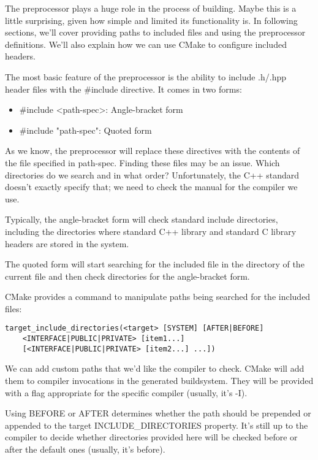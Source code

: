 
The preprocessor plays a huge role in the process of building. Maybe this is a little surprising, given how simple and limited its functionality is. In following sections, we'll cover providing paths to included files and using the preprocessor definitions. We'll also explain how we can use CMake to configure included headers.


The most basic feature of the preprocessor is the ability to include .h/.hpp header files with the \#include directive. It comes in two forms:

\begin{itemize}
\item 
\#include <path-spec>: Angle-bracket form

\item 
\#include "path-spec": Quoted form
\end{itemize}

As we know, the preprocessor will replace these directives with the contents of the file specified in path-spec. Finding these files may be an issue. Which directories do we search and in what order? Unfortunately, the C++ standard doesn't exactly specify that; we need to check the manual for the compiler we use.

Typically, the angle-bracket form will check standard include directories, including the directories where standard C++ library and standard C library headers are stored in the system.

The quoted form will start searching for the included file in the directory of the current file and then check directories for the angle-bracket form.

CMake provides a command to manipulate paths being searched for the included files:

\begin{lstlisting}[style=styleCMake]
target_include_directories(<target> [SYSTEM] [AFTER|BEFORE]
	<INTERFACE|PUBLIC|PRIVATE> [item1...]
	[<INTERFACE|PUBLIC|PRIVATE> [item2...] ...])
\end{lstlisting}

We can add custom paths that we'd like the compiler to check. CMake will add them to compiler invocations in the generated buildsystem. They will be provided with a flag appropriate for the specific compiler (usually, it's -I).

Using BEFORE or AFTER determines whether the path should be prepended or appended to the target INCLUDE\_DIRECTORIES property. It's still up to the compiler to decide whether directories provided here will be checked before or after the default ones (usually, it's before).

